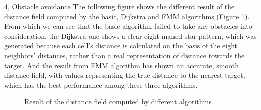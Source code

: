 \documentclass[10pt,a4paper]{article}
\begin{document}
\begin{task}{4, Obstacle avoidance}
The following figure shows the different result of the distance field computed by the basic, Dijkstra and FMM algorithms (Figure \ref{f44}). From which we can see that the basic algorithm failed to take any obstacles into consideration, the Dijkstra one shows a clear eight-maned star pattern, which was generated because each cell's distance is calculated on the basis of the eight neighbors' distances, rather than a real representation of distance towards the target. And the result from FMM algorithm has shown an accurate, smooth distance field, with values representing the true distance to the nearest target, which has the best performance among these three algorithms.

\begin{figure} [H]
 \centering
 \caption{Result of the distance field computed by different algorithms}
 \label{f44}
\end{figure}

\end{task}

\pagebreak 
\end{document}
